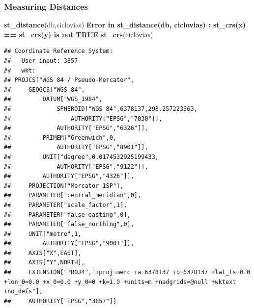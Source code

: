 \documentclass[
  shownotes,
  xcolor={svgnames},
  hyperref={colorlinks,citecolor=DarkBlue,linkcolor=DarkRed,urlcolor=DarkBlue}
  ]{beamer}
\newenvironment{Shaded}{\begin{snugshade}}{\end{snugshade}}
\newcommand{\ErrorTok}[1]{\textcolor[rgb]{0.64,0.00,0.00}{\textbf{#1}}}
\newcommand{\KeywordTok}[1]{\textcolor[rgb]{0.13,0.29,0.53}{\textbf{#1}}}
\newcommand{\NormalTok}[1]{#1}
\begin{document}
\begin{frame}[fragile]
\frametitle{Measuring Distances}

\begin{scriptsize}
\begin{Shaded}
\begin{Highlighting}[]
\KeywordTok{st\_distance}\NormalTok{(db,ciclovias)}
\ErrorTok{Error in st_distance(db, ciclovias) : st_crs(x) == st_crs(y) is not TRUE}
\KeywordTok{st\_crs}\NormalTok{(ciclovias)}
\end{Highlighting}
\end{Shaded}
\end{scriptsize}
\begin{tiny}
\begin{verbatim}
## Coordinate Reference System:
##   User input: 3857 
##   wkt:
## PROJCS["WGS 84 / Pseudo-Mercator",
##     GEOGCS["WGS 84",
##         DATUM["WGS_1984",
##             SPHEROID["WGS 84",6378137,298.257223563,
##                 AUTHORITY["EPSG","7030"]],
##             AUTHORITY["EPSG","6326"]],
##         PRIMEM["Greenwich",0,
##             AUTHORITY["EPSG","8901"]],
##         UNIT["degree",0.0174532925199433,
##             AUTHORITY["EPSG","9122"]],
##         AUTHORITY["EPSG","4326"]],
##     PROJECTION["Mercator_1SP"],
##     PARAMETER["central_meridian",0],
##     PARAMETER["scale_factor",1],
##     PARAMETER["false_easting",0],
##     PARAMETER["false_northing",0],
##     UNIT["metre",1,
##         AUTHORITY["EPSG","9001"]],
##     AXIS["X",EAST],
##     AXIS["Y",NORTH],
##     EXTENSION["PROJ4","+proj=merc +a=6378137 +b=6378137 +lat_ts=0.0 +lon_0=0.0 +x_0=0.0 +y_0=0 +k=1.0 +units=m +nadgrids=@null +wktext +no_defs"],
##     AUTHORITY["EPSG","3857"]]
\end{verbatim}
\end{tiny}
\end{frame}
\end{document}
